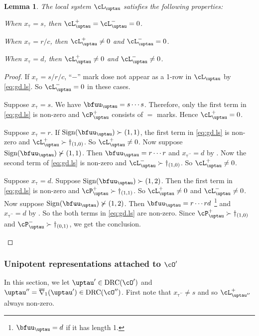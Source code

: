 \documentclass[12pt,a4paper]{amsart}
\def\eDDo{\overline{\nabla}_1}
\numberwithin{equation}{section}
\newtheorem{lem}[thm]{Lemma}
\theoremstyle{remark}
\def\ssign{\mathrm{Sign}}
\def\drc{\mathrm{DRC}}
\def\cOp{\cO^{\prime}}
\def\cOpp{\cO^{\prime\prime}}
\def\pcL{\cL^+}
\def\ncL{\cL^-}
\def\pcP{\cP^+}
\def\ncP{\cP^-}
\def\uptaup{\uptau^{\prime}}
\def\uptaupp{\uptau^{\prime\prime}}
\begin{document}
\begin{lem}
  The local system $\cL_{\uptau}$ satisfies the following properties:
  \begin{enumT}
    \item When $x_{\uptau} = s$, then $\pcL_{\uptau} = \ncL_{\uptau} = 0$.
    \item When $x_{\uptau} = r/c$, then $\pcL_{\uptau} \neq 0$ and $\ncL_{\uptau}=0$.
    \item When $x_{\uptau} = d$, then $\pcL_{\uptau}\neq 0$ and $\ncL_{\uptau}\neq 0$.
  \end{enumT}
\end{lem}
\begin{proof}
  If $x_{\uptau}=s/r/c$,  ``$-$'' mark dose not appear as a 1-row in
  $\cL_{\uptau}$ by \eqref{eq:gd.ls}. So $\ncL_{\uptau}=0$ in these cases.

  \begin{enumPF}
    \item  Suppose $x_{\uptau}=s$. We have $\bfuu_{\uptau}=s\cdots s$.
    Therefore, only the first term in  \eqref{eq:gd.ls} is non-zero and
    $\pcP_{\uptau}$ consists of $=$ marks. Hence $\pcL_{\uptau} =0$.
    \item Suppose $x_{\uptau}=r$. If $\ssign(\bfuu_{\uptau})\succ(1,1)$, the
    first term in \eqref{eq:gd.ls} is non-zero and $\pcL_{\uptau}\succ \dagger_{(1,0)}$.
    So $\pcL_{\uptau}\neq 0$.
    Now suppose $\ssign(\bfuu_{\uptau})\nsucc (1,1)$. Then
    $\bfuu_{\uptau}=r\cdots r$ and $x_{\uptaupp}=d$ by .
    Now the second term of \eqref{eq:gd.ls} is non-zero and
    $\ncL_{\uptau}\succ\dagger_{(1,0)}$. So $\pcL_{\uptau}\neq 0$.
    \item Suppose $x_{\uptau}=d$. Suppose $\ssign(\bfuu_{\uptau})\succ (1,2)$.
    Then the first term in \eqref{eq:gd.ls} is non-zero and
    $\pcP_{\uptau}\succ \dagger_{(1,1)}$. So $\pcL_{\uptau}\neq 0$ and
    $\ncL_{\uptau}\neq 0$.
    Now suppose $\ssign(\bfuu_{\uptau})\nsucc(1,2)$. Then
    $\bfuu_{\uptau} = r\cdots rd$
    \footnote{$\bfuu_{\uptau}=d$ if it has length 1.} and
    $x_{\uptaupp}=d$ by .
    So the both terms in \eqref{eq:gd.ls} are non-zero. Since
    $\pcP_{\uptau}\succ \dagger_{(1,0)}$  and
    $\ncP_{\uptau}\succ \dagger_{(0,1)}$, we get the conclusion.
  \end{enumPF}
\end{proof}

\subsubsection{Unipotent representations attached to $\cOp$}
In this section, we let $\uptaup\in \drc(\cOp)$ and
$\uptaupp  = \eDDo(\uptaup)\in \drc(\cOpp)$. First note that
$x_{\uptaupp}\neq s$ and so $\pcL_{\uptaupp}$ always non-zero.
\end{document}
